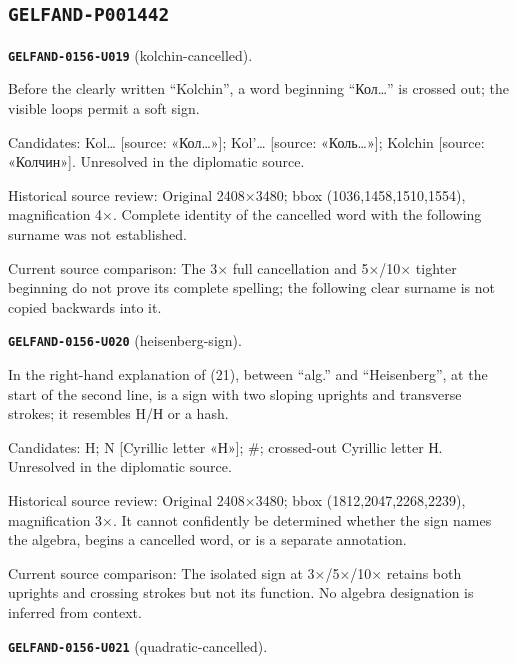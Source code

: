 \subsection*{\texttt{GELFAND-P001442}}
\par\noindent\leavevmode{}\label{GELFAND-0156-U019}\label{GELFAND-P001442:kolchin-cancelled}\textbf{\texttt{GELFAND-0156-U019}} (kolchin-cancelled).\nopagebreak[4]\par
Before the clearly written “Kolchin”, a word beginning “Кол…” is crossed out; the visible loops permit a soft sign.\par
Candidates: Kol… [source: «Кол…»]; Kol'… [source: «Коль…»]; Kolchin [source: «Колчин»]. Unresolved in the diplomatic source.\par
Historical source review: Original 2408×3480; bbox (1036,1458,1510,1554), magnification 4×. Complete identity of the cancelled word with the following surname was not established.\par
Current source comparison: The 3× full cancellation and 5×/10× tighter beginning do not prove its complete spelling; the following clear surname is not copied backwards into it.\par\medskip
\par\noindent\leavevmode{}\label{GELFAND-0156-U020}\label{GELFAND-P001442:heisenberg-sign}\textbf{\texttt{GELFAND-0156-U020}} (heisenberg-sign).\nopagebreak[4]\par
In the right-hand explanation of (21), between “alg.” and “Heisenberg”, at the start of the second line, is a sign with two sloping uprights and transverse strokes; it resembles H/Н or a hash.\par
Candidates: H; N [Cyrillic letter «Н»]; \#; crossed-out Cyrillic letter Н. Unresolved in the diplomatic source.\par
Historical source review: Original 2408×3480; bbox (1812,2047,2268,2239), magnification 3×. It cannot confidently be determined whether the sign names the algebra, begins a cancelled word, or is a separate annotation.\par
Current source comparison: The isolated sign at 3×/5×/10× retains both uprights and crossing strokes but not its function. No algebra designation is inferred from context.\par\medskip
\par\noindent\leavevmode{}\label{GELFAND-0156-U021}\label{GELFAND-P001442:quadratic-cancelled}\textbf{\texttt{GELFAND-0156-U021}} (quadratic-cancelled).\nopagebreak[4]\par
